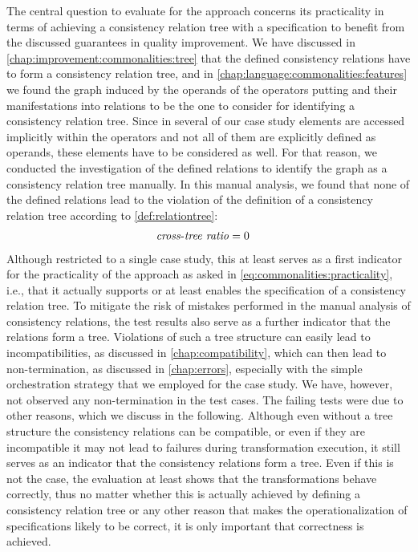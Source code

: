 The central question to evaluate for the \commonalities approach concerns its practicality in terms of achieving a consistency relation tree with a \commonalities specification to benefit from the discussed guarantees in quality improvement.
We have discussed in \autoref{chap:improvement:commonalities:tree} that the defined consistency relations have to form a consistency relation tree, and in \autoref{chap:language:commonalities:features} we found the graph induced by the operands of the operators putting \commonalities and their manifestations into relations to be the one to consider for identifying a consistency relation tree.
Since in several \commonalities of our case study elements are accessed implicitly within the operators and not all of them are explicitly defined as operands, these elements have to be considered as well.
For that reason, we conducted the investigation of the defined relations to identify the graph as a consistency relation tree manually.
In this manual analysis, we found that none of the defined relations lead to the violation of the definition of a consistency relation tree according to \autoref{def:relationtree}:
\begin{align*}
    &
    \mathit{cross\mbox{-}tree\ ratio} = 0
\end{align*}
Although restricted to a single case study, this at least serves as a first indicator for the practicality of the approach as asked in \autoref{eq:commonalities:practicality}, i.e., that it actually supports or at least enables the specification of a consistency relation tree.
To mitigate the risk of mistakes performed in the manual analysis of consistency relations, the test results also serve as a further indicator that the relations form a tree.
Violations of such a tree structure can easily lead to incompatibilities, as discussed in \autoref{chap:compatibility}, which can then lead to non-termination, as discussed in \autoref{chap:errors}, especially with the simple orchestration strategy that we employed for the case study.
We have, however, not observed any non-termination in the test cases.
The failing tests were due to other reasons, which we discuss in the following.
Although even without a tree structure the consistency relations can be compatible, or even if they are incompatible it may not lead to failures during transformation execution, it still serves as an indicator that the consistency relations form a tree.
Even if this is not the case, the evaluation at least shows that the transformations behave correctly, thus no matter whether this is actually achieved by defining a consistency relation tree or any other reason that makes the operationalization of \commonalities specifications likely to be correct, it is only important that correctness is achieved.


